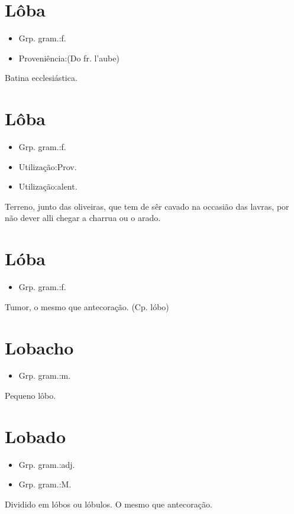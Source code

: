 \section{Lôba}
\begin{itemize}
\item {Grp. gram.:f.}
\end{itemize}
\begin{itemize}
\item {Proveniência:(Do fr. \textunderscore l'aube\textunderscore )}
\end{itemize}
Batina ecclesiástica.
\section{Lôba}
\begin{itemize}
\item {Grp. gram.:f.}
\end{itemize}
\begin{itemize}
\item {Utilização:Prov.}
\end{itemize}
\begin{itemize}
\item {Utilização:alent.}
\end{itemize}
Terreno, junto das oliveiras, que tem de sêr cavado na occasião das lavras, por não dever alli chegar a charrua ou o arado.
\section{Lóba}
\begin{itemize}
\item {Grp. gram.:f.}
\end{itemize}
Tumor, o mesmo que \textunderscore antecoração\textunderscore .
(Cp. \textunderscore lóbo\textunderscore )
\section{Lobacho}
\begin{itemize}
\item {Grp. gram.:m.}
\end{itemize}
Pequeno lôbo.
\section{Lobado}
\begin{itemize}
\item {Grp. gram.:adj.}
\end{itemize}
\begin{itemize}
\item {Grp. gram.:M.}
\end{itemize}
Dividido em lóbos ou lóbulos.
O mesmo que \textunderscore antecoração\textunderscore .

